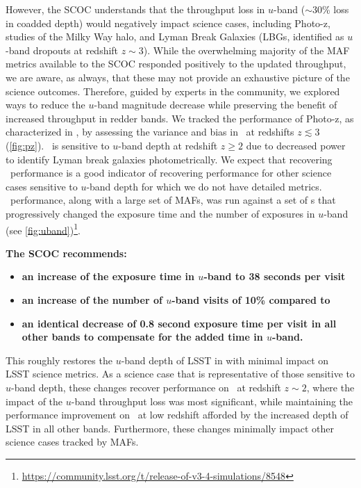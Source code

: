 However, the SCOC understands that the throughput loss in $u$-band (\mbox{$\sim$30\%}  loss in coadded depth) would negatively impact science cases, including Photo-z, studies of the Milky Way halo, and Lyman Break Galaxies (LBGs, identified as $u$-band dropouts at redshift $z\sim3$). While the overwhelming majority of the MAF metrics available to the SCOC responded positively to the updated throughput, we are aware, as always, that these may not provide an exhaustive picture of the science outcomes. Therefore, guided by experts in the community, we explored ways to reduce the $u$-band magnitude decrease while preserving the benefit of increased throughput in redder bands. 
We tracked the performance of Photo-z, as characterized in \citealt{Graham_2017}, by assessing the variance and bias in \pz\ at redshifts $z\lesssim{3}$ (\autoref{fig:pz}). \pz\ is sensitive to $u$-band depth at redshift $z\geq 2$ due to decreased power to identify Lyman break galaxies photometrically. We expect that recovering \pz\ performance is a good indicator of recovering performance for other science cases sensitive to $u$-band depth for which we do not have detailed metrics. \pz\ performance, along with a large set of MAFs, was run against a set of \opsim s  that progressively changed the exposure time and the number of exposures in $u$-band (see \autoref{fig:uband})\footnote{\url{https://community.lsst.org/t/release-of-v3-4-simulations/8548}}. 

{\bf The SCOC recommends:} 

\begin{itemize} 
\item {\bf an increase of the exposure time in $u$-band to 38 seconds per visit}
\item {\bf an increase of the number of $u$-band visits of 10\% compared to }
\item {\bf an identical decrease of 0.8 second exposure time per visit in all other bands to compensate for the added time in $u$-band.} 
\end{itemize}


This roughly restores the $u$-band depth of LSST in  with minimal impact on LSST science metrics. As a science case that is representative of those sensitive to $u$-band depth, these changes recover performance on \pz\ at redshift $z\sim2$, where the impact of the $u$-band throughput loss was most significant, while maintaining the performance improvement on \pz\ at low redshift afforded by the increased depth of LSST in all other bands. Furthermore, these changes minimally impact other science cases tracked by MAFs. 

